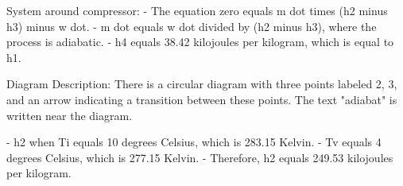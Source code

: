 System around compressor:
- The equation zero equals m dot times (h2 minus h3) minus w dot.
- m dot equals w dot divided by (h2 minus h3), where the process is adiabatic.
- h4 equals 38.42 kilojoules per kilogram, which is equal to h1.

Diagram Description: There is a circular diagram with three points labeled 2, 3, and an arrow indicating a transition between these points. The text "adiabat" is written near the diagram.

- h2 when Ti equals 10 degrees Celsius, which is 283.15 Kelvin.
- Tv equals 4 degrees Celsius, which is 277.15 Kelvin.
- Therefore, h2 equals 249.53 kilojoules per kilogram.